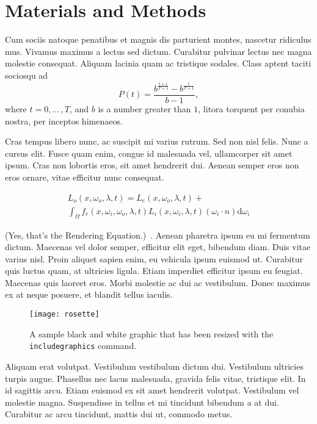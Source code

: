 \documentclass[sigconf,review,anonymous]{acmart}
\begin{document}
\section{Materials and Methods}

Cum sociis natoque penatibus et magnis dis parturient montes, nascetur ridiculus mus. Vivamus maximus a lectus sed dictum. Curabitur pulvinar lectus nec magna molestie consequat. Aliquam lacinia quam ac tristique sodales. Class aptent taciti sociosqu ad 
\begin{equation}
\label{eqn:01}
P(t)=\frac{b^{\frac{t+1}{T+1}}-b^{\frac{t}{T+1}}}{b-1},
\end{equation}
where $t=0,{\ldots}\,,T$, and $b$ is a number greater than $1$, litora torquent per conubia nostra, per inceptos himenaeos.

Cras tempus libero nunc, ac suscipit mi varius rutrum. Sed non nisl felis. Nunc a cursus elit. Fusce quam enim, congue id malesuada vel, ullamcorper sit amet ipsum. Cras non lobortis eros, sit amet hendrerit dui. Aenean semper eros non eros ornare, vitae efficitur nunc consequat. 

\begin{multline}
\label{the-rendering-equation}
L_o(x, \omega_o, \lambda, t) = L_e(x, \omega_o, \lambda, t)  + \\
\int_{\Omega} f_r(x, \omega_i, \omega_o, \lambda, t) L_i(x, \omega_i, \lambda, t)(\omega_i \cdot n) \text{d} \omega_i
\end{multline}

(Yes, that's the Rendering Equation.)~\cite{Kajiya:1986:RE:15922.15902}. Aenean pharetra ipsum eu mi fermentum dictum. Maecenas vel dolor semper, efficitur elit eget, bibendum diam. Duis vitae varius nisl. Proin aliquet sapien enim, eu vehicula ipsum euismod ut. Curabitur quis luctus quam, at ultricies ligula. Etiam imperdiet efficitur ipsum eu feugiat. Maecenas quis laoreet eros. Morbi molestie ac dui ac vestibulum. Donec maximus ex at neque posuere, et blandit tellus iaculis.

\begin{figure}[h]
\texttt{[image: rosette]}
\caption{A sample black and white graphic that has
been resized with the \texttt{includegraphics} command.}
\end{figure}

Aliquam erat volutpat. Vestibulum vestibulum dictum dui. Vestibulum ultricies turpis augue. Phasellus nec lacus malesuada, gravida felis vitae, tristique elit. In id sagittis arcu. Etiam euismod ex sit amet hendrerit volutpat. Vestibulum vel molestie magna. Suspendisse in tellus et mi tincidunt bibendum a at dui. Curabitur ac arcu tincidunt, mattis dui ut, commodo metus.
\end{document}
